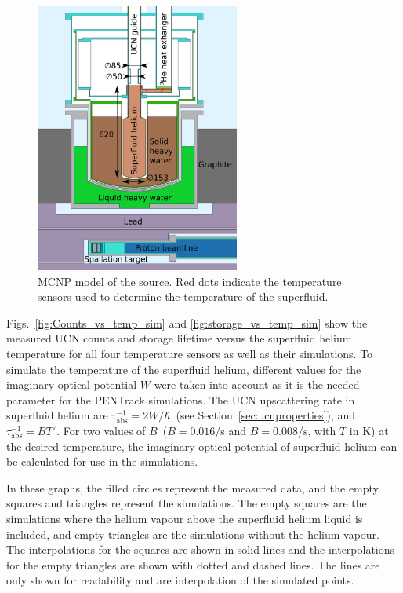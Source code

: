 \begin{figure}[h!]
  \centering
  \includegraphics[width=0.6\textwidth]{MCNPmodel.pdf}
  \caption[MCNP model of the UCN source]{MCNP model of the source. Red
    dots indicate the temperature sensors used to determine the
    temperature of the superfluid.}
  \label{fig:mcnpmodel}
\end{figure}


Figs.~\ref{fig:Counts_vs_temp_sim} and \ref{fig:storage_vs_temp_sim}
show the measured UCN counts and storage lifetime versus the
superfluid helium temperature for all four temperature sensors as well
as their simulations. To simulate the temperature of the superfluid
helium, different values for the imaginary optical potential $W$ were
taken into account as it is the needed parameter for the PENTrack
simulations. The UCN upscattering rate in superfluid helium are
$\tau_{\mathrm{abs}}^{-1} = 2W/\hbar$~(see
Section~\ref{sec:ucnproperties}), and
$\tau_{\mathrm{abs}}^{-1} = B T^7$. For two values of
$B$~($B = 0.016$/s and $B = 0.008$/s, with $T$ in K) at the desired
temperature, the imaginary optical potential of superfluid helium can
be calculated for use in the simulations.



In these graphs, the filled circles represent the measured data, and
the empty squares and triangles represent the simulations.  The empty
squares are the simulations where the helium vapour above the
superfluid helium liquid is included, and empty triangles are the
simulations without the helium vapour. The interpolations for the
squares are shown in solid lines and the interpolations for the empty
triangles are shown with dotted and dashed lines. The lines are only
shown for readability and are interpolation of the simulated points.



